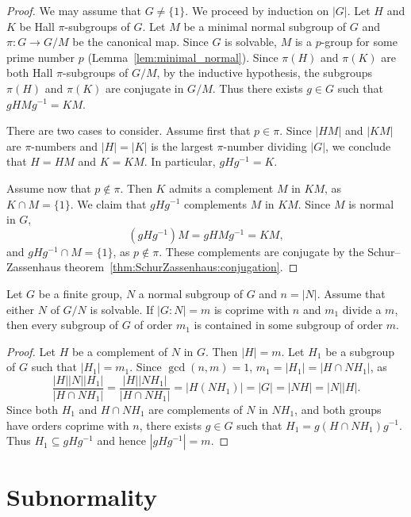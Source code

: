 \begin{proof}
	We may assume that $G\ne\{1\}$. We proceed by induction on $|G|$.  Let $H$
	and $K$ be Hall $\pi$-subgroups of $G$. Let $M$ be a minimal normal subgroup of 
    $G$ and $\pi\colon G\to G/M$ be the canonical map. Since $G$ is solvable, 
	$M$ is a $p$-group for some prime number $p$ (Lemma~\ref{lem:minimal_normal}). 
    Since $\pi(H)$ and $\pi(K)$ are both Hall 
	$\pi$-subgroups of $G/M$, by the inductive hypothesis, 
    the subgroups $\pi(H)$ and $\pi(K)$ are 
	conjugate in $G/M$. Thus there exists $g\in G$ such that $gHMg^{-1}=KM$. 

	There are two cases to consider. Assume first that $p\in\pi$. Since $|HM|$ and 
	$|KM|$ are $\pi$-numbers and $|H|=|K|$ is the largest $\pi$-number dividing $|G|$, 
    we conclude that $H=HM$ and $K=KM$. In particular, $gHg^{-1}=K$. 

	Assume now that $p\not\in\pi$. Then $K$ admits a complement $M$ in 
 	$KM$, as $K\cap M=\{1\}$. We claim that $gHg^{-1}$ complements $M$ in $KM$. Since 
	$M$ is normal in $G$, 
 	\[
	(gHg^{-1})M=gHMg^{-1}=KM,
	\]
	and $gHg^{-1}\cap M=\{1\}$, as $p\not\in\pi$. These complements are conjugate 
    by the Schur--Zassenhaus theorem~\ref{thm:SchurZassenhaus:conjugation}.
\end{proof}

\begin{corollary}
	Let $G$ be a finite group, $N$ a normal subgroup of $G$ and $n=|N|$. 
 	Assume that either $N$ of $G/N$ is solvable. 
    If $|G:N|=m$ is coprime with $n$ and 
    $m_1$ divide a $m$, then every subgroup of $G$ of order $m_1$ 
    is contained in some subgroup of order $m$. 
\end{corollary}

\begin{proof}
	Let $H$ be a complement of $N$ in $G$. Then $|H|=m$. Let $H_1$
	be a subgroup of $G$ such that $|H_1|=m_1$. 
	Since $\gcd(n,m)=1$, $m_1=|H_1|=|H\cap NH_1|$, as 
	\[
	\frac{|H||N||H_1|}{|H\cap NH_1|}=
	\frac{|H||NH_1|}{|H\cap NH_1|}=|H(NH_1)|=|G|=|NH|=|N||H|.
	\]
	Since both $H_1$ and $H\cap NH_1$ are complements of $N$ in $NH_1$, and both 
    groups have orders coprime with $n$, there exists 
	$g\in G$ such that $H_1=g(H\cap NH_1)g^{-1}$. Thus  
	$H_1\subseteq gHg^{-1}$ and hence $|gHg^{-1}|=m$. 
\end{proof}


\section{Subnormality}

